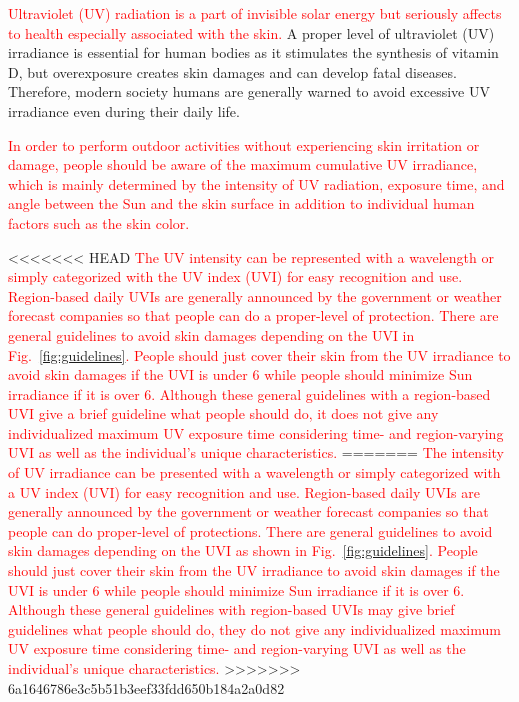 \documentclass[journal]{IEEEtran}
\begin{document}
\textcolor{red}{Ultraviolet (UV) radiation is a part of invisible solar energy but seriously affects to health especially associated with the skin.}
A proper level of ultraviolet (UV) irradiance is essential for human bodies as it stimulates the synthesis of vitamin D, but overexposure creates skin damages and can develop fatal diseases. Therefore, modern society humans are generally warned to avoid excessive UV irradiance even during their daily life.

\textcolor{red}{In order to perform  outdoor activities without experiencing skin irritation or damage, people should be aware of the maximum cumulative UV irradiance, which is mainly determined by the intensity of UV radiation, exposure time, and angle between the Sun and the skin surface in addition to individual human factors such as the skin color.}%

<<<<<<< HEAD
\textcolor{red}{The UV intensity can be represented with a wavelength or simply categorized with the UV index (UVI) for easy recognition and use. Region-based daily UVIs are generally announced by the government or weather forecast companies so that people can do a proper-level of protection. There are general guidelines to avoid skin damages depending on the UVI in Fig.~\ref{fig:guidelines}. People should just cover their skin from the UV irradiance to avoid skin damages if the UVI is under 6 while people should minimize Sun irradiance if it is over 6. Although these general guidelines with a region-based UVI give a brief guideline what people should do, it does not give any individualized maximum UV exposure time considering time- and region-varying UVI as well as the individual's unique characteristics.}
=======
\textcolor{red}{The intensity of UV irradiance can be presented with a wavelength or simply categorized with a UV index (UVI) for easy recognition and use. Region-based daily UVIs are generally announced by the government or weather forecast companies so that people can do proper-level of protections. There are general guidelines to avoid skin damages depending on the UVI as shown in Fig.~\ref{fig:guidelines}. People should just cover their skin from the UV irradiance to avoid skin damages if the UVI is under 6 while people should minimize Sun irradiance if it is over 6. Although these general guidelines with region-based UVIs may give brief guidelines what people should do, they do not give any individualized maximum UV exposure time considering time- and region-varying UVI as well as the individual's unique characteristics.}
>>>>>>> 6a1646786e3c5b51b3eef33fdd650b184a2a0d82
\end{document}
